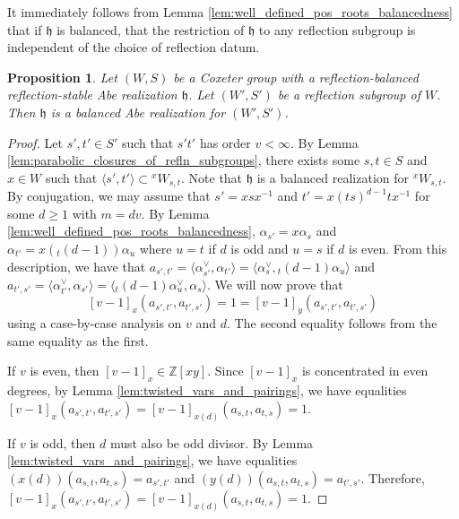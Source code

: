 \documentclass{amsart}
\newcommand{\Z}{\mathbb{Z}}
\newcommand{\fr}[1]{\mathfrak{#1}}
\newtheorem{proposition}[subsubsection]{Proposition}
\theoremstyle{definition}
\numberwithin{equation}{subsection}
\begin{document}
It immediately follows from Lemma \ref{lem:well_defined_pos_roots_balancedness} that if $\fr{h}$ is balanced, that the restriction of $\fr{h}$ to any reflection subgroup is independent of the choice of reflection datum.

\begin{proposition}\label{prop:balanced_realizations_and_reflections}
    Let $(W,S)$ be a Coxeter group with a reflection-balanced reflection-stable Abe realization $\fr{h}$.
    Let $(W', S')$ be a reflection subgroup of $W$. Then $\fr{h}$ is a balanced Abe realization for $(W', S')$.
\end{proposition}
\begin{proof}
    Let $s', t' \in S'$ such that $s't'$ has order $v < \infty$. By Lemma \ref{lem:parabolic_closures_of_refln_subgroups}, there exists some $s,t \in S$ and $x \in W$ such that 
    $\langle s',t' \rangle \subset {}^x W_{s,t}$.
    Note that $\fr{h}$ is a balanced realization for ${}^x W_{s,t}$.
    By conjugation, we may assume that $s' = xsx^{-1}$ and $t' = x (ts)^{d-1} t x^{-1}$ for some $d \geq 1$ with $m = dv$.
    By Lemma \ref{lem:well_defined_pos_roots_balancedness}, $\alpha_{s'} = x\alpha_s$ and $\alpha_{t'} = x ({}_{t} (d-1)) \alpha_u$ where $u = t$ if $d$ is odd and $u = s$ if $d$ is even.
    From this description, we have that $a_{s',t'} = \langle \alpha_{s'}^{\vee}, \alpha_{t'} \rangle = \langle \alpha_s^{\vee}, {}_{t} (d-1) \alpha_u \rangle$ and $a_{t', s'} = \langle \alpha_{t'}^{\vee}, \alpha_{s'} \rangle = \langle  {}_{t} (d-1) \alpha_u^{\vee}, \alpha_s\rangle$.
    We will now prove that
    \[[v-1]_x (a_{s',t'}, a_{t',s'}) = 1 = [v-1]_y (a_{s',t'}, a_{t',s'})\]
    using a case-by-case analysis on $v$ and $d$. The second equality follows from the same equality as the first.

    If $v$ is even, then $[v-1]_x \in \Z[xy]$. Since $[v-1]_x$ is concentrated in even degrees, by Lemma \ref{lem:twisted_vars_and_pairings}, we have equalities $[v-1]_x (a_{s',t'}, a_{t',s'}) = [v-1]_{x(d)} (a_{s,t}, a_{t,s}) = 1$.

    If $v$ is odd, then $d$ must also be odd divisor. By Lemma \ref{lem:twisted_vars_and_pairings}, we have equalities $(x(d)) (a_{s,t}, a_{t,s}) = a_{s',t'}$ and $(y(d)) (a_{s,t}, a_{t,s}) = a_{t',s'}$.
    Therefore, $[v-1]_x (a_{s',t'}, a_{t',s'}) = [v-1]_{x(d)} (a_{s,t}, a_{t,s}) = 1$. 
\end{proof}
\end{document}
